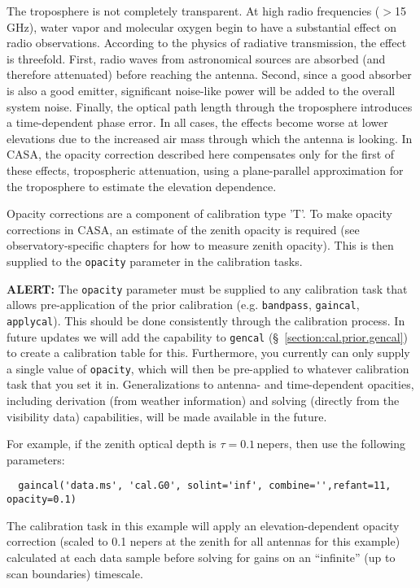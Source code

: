 The troposphere is not completely transparent.  At high radio
frequencies ($>$15 GHz), water vapor and molecular oxygen begin to
have a substantial effect on radio observations. According to the
physics of radiative transmission, the effect is threefold.  First,
radio waves from astronomical sources are absorbed (and therefore
attenuated) before reaching the antenna.  Second, since a good absorber
is also a good emitter, significant noise-like power will be added to
the overall system noise.  Finally, the optical path length through
the troposphere introduces a time-dependent phase error.  In all
cases, the effects become worse at lower elevations due to the
increased air mass through which the antenna is looking.  In CASA,
the opacity correction described here compensates only for the first
of these effects, tropospheric attenuation, using a plane-parallel
approximation for the troposphere to estimate the elevation
dependence.

Opacity corrections are a component of calibration type 'T'.  To make
opacity corrections in CASA, an estimate of the zenith opacity is
required (see observatory-specific chapters for how to measure zenith
opacity).  This is then supplied to the {\tt opacity} parameter in
the calibration tasks.

{\bf ALERT:} The {\tt opacity} parameter must be supplied
to any calibration task that allows pre-application of the prior
calibration (e.g. {\tt bandpass}, {\tt gaincal}, {\tt applycal}).
This should be done consistently through the calibration process.
In future updates we will add the capability to {\tt gencal}
(\S~\ref{section:cal.prior.gencal}) to create a calibration table for this.
Furthermore, you currently can only supply a single value
of {\tt opacity}, which will then be pre-applied to whatever 
calibration task that you set it in.
Generalizations to antenna- and time-dependent opacities, including
derivation (from weather information) and solving (directly from the
visibility data) capabilities, will be made available in the future.

For example, if the zenith optical depth is $\tau=0.1$\,nepers, then
use the following parameters:
\small
\begin{verbatim}
  gaincal('data.ms', 'cal.G0', solint='inf', combine='',refant=11, opacity=0.1)
\end{verbatim}
\normalsize
The calibration task in this example will apply an
elevation-dependent opacity correction (scaled to 0.1 nepers at the
zenith for all antennas for this example) calculated at each 
data sample before solving for gains on an ``infinite'' (up to scan
boundaries) timescale. 

